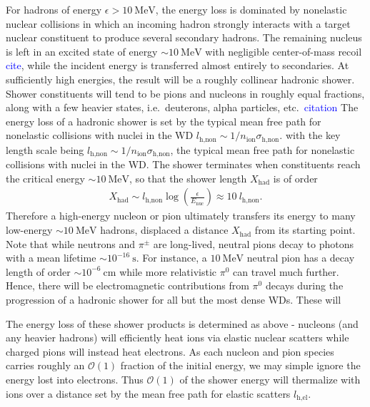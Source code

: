 \documentclass[twocolumn,showpacs,preprintnumbers,amsmath,amssymb,prd]{revtex4}
\newcommand{\OO}{\mathcal{O}}
\def\r{\right)}
\def\l{\left(}
\begin{document}
For hadrons of energy $\epsilon > 10 ~\text{MeV}$, the energy loss is dominated by nonelastic nuclear collisions in which an incoming hadron strongly interacts with a target nuclear constituent to produce several secondary hadrons.
The remaining nucleus is left in an excited state of energy $\sim 10 ~\text{MeV}$ with negligible center-of-mass recoil \textcolor{blue}{cite}, while the incident energy is transferred almost entirely to secondaries.
At sufficiently high energies, the result will be a roughly collinear hadronic shower. 
Shower constituents will tend to be pions and nucleons in roughly equal fractions, along with a few heavier states, i.e.\ deuterons, alpha particles, etc.\ \textcolor{blue}{citation}
The energy loss of a hadronic shower is set by the typical mean free path for nonelastic collisions with nuclei in the WD $l_\text{h,non} \sim 1/n_\text{ion} \sigma_\text{h,non}$. 
with the key length scale being $l_\text{h,non} \sim 1/n_\text{ion} \sigma_\text{h,non}$, the typical mean free path for nonelastic collisions with nuclei in the WD.
The shower terminates when constituents reach the critical energy $\sim 10 ~\text{MeV}$, so that the shower length $X_{\text{had}}$ is of order
\begin{align}
\label{eq:hadlength}
  X_{\text{had}} \sim l_\text{h,non} \log\l\frac{\epsilon}{E_\text{nuc}}\r
  \approx 10 ~l_\text{h,non}.
\end{align}
Therefore a high-energy nucleon or pion ultimately transfers its energy to many low-energy $\sim 10 ~\text{MeV}$ hadrons, displaced a distance $X_\text{had}$ from its starting point.
Note that while neutrons and $\pi^\pm$ are long-lived, neutral pions decay to photons with a mean lifetime $\sim 10^{-16} ~\text{s}$. 
For instance, a $10 ~\text{MeV}$ neutral pion has a decay length of order $\sim 10^{-6} ~\text{cm}$ while more relativistic $\pi^0$ can travel much further.
Hence, there will be electromagnetic contributions from $\pi^0$ decays during the progression of a hadronic shower for all but the most dense WDs. 
These will 
 

The energy loss of these shower products is determined as above - nucleons (and any heavier hadrons) will efficiently heat ions via elastic nuclear scatters while charged pions will instead heat electrons. 
As each nucleon and pion species carries roughly an $\OO(1)$ fraction of the initial energy, we may simple ignore the energy lost into electrons.
Thus $\OO(1)$ of the shower energy will thermalize with ions over a distance set by the mean free path for elastic scatters $ l_\text{h,el}$. 
\end{document}
